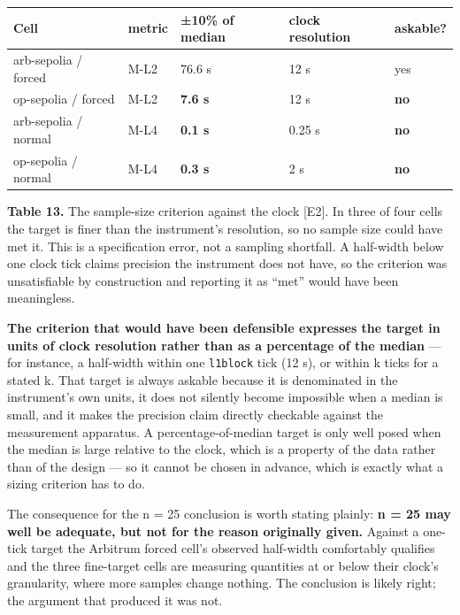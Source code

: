 \documentclass[conference]{IEEEtran}
\renewcommand{\_}{\textunderscore\allowbreak}
\begin{document}
\begin{table}[!t]
\centering
\small
\begin{tabular}{@{}lllll@{}}
\toprule
Cell & metric & ±10\% of median & clock resolution & askable? \\
\midrule
arb-sepolia / forced & M-L2 & 76.6 s & 12 s & yes \\
op-sepolia / forced & M-L2 & \textbf{7.6 s} & 12 s & \textbf{no} \\
arb-sepolia / normal & M-L4 & \textbf{0.1 s} & 0.25 s & \textbf{no} \\
op-sepolia / normal & M-L4 & \textbf{0.3 s} & 2 s & \textbf{no} \\
\bottomrule
\end{tabular}
\par\vspace{5pt}
{\footnotesize\raggedright \textbf{Table 13.} The sample-size criterion against the clock {[}E2{]}.
In three of four cells the target is finer than the instrument's
resolution, so no sample size could have met it. This is a specification
error, not a sampling shortfall. A half-width below one clock tick
claims precision the instrument does not have, so the criterion was
unsatisfiable by construction and reporting it as ``met'' would have
been meaningless.\par}
\end{table}

\textbf{The criterion that would have been defensible expresses the
target in units of clock resolution rather than as a percentage of the
median} --- for instance, a half-width within one \texttt{l1\_block}
tick (12 s), or within k ticks for a stated k. That target is always
askable because it is denominated in the instrument's own units, it does
not silently become impossible when a median is small, and it makes the
precision claim directly checkable against the measurement apparatus. A
percentage-of-median target is only well posed when the median is large
relative to the clock, which is a property of the data rather than of
the design --- so it cannot be chosen in advance, which is exactly what
a sizing criterion has to do.

The consequence for the n = 25 conclusion is worth stating plainly:
\textbf{n = 25 may well be adequate, but not for the reason originally
given.} Against a one-tick target the Arbitrum forced cell's observed
half-width comfortably qualifies and the three fine-target cells are
measuring quantities at or below their clock's granularity, where more
samples change nothing. The conclusion is likely right; the argument
that produced it was not.
\end{document}
